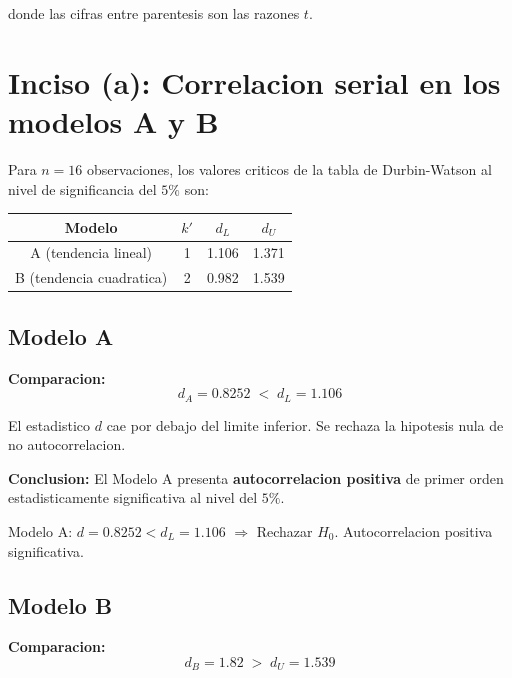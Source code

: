 \documentclass[12pt, letterpaper]{article}
\begin{document}
donde las cifras entre parentesis son las razones $t$.

\section{Inciso (a): Correlacion serial en los modelos A y B}

Para $n = 16$ observaciones, los valores criticos de la tabla de Durbin-Watson
al nivel de significancia del $5\%$ son:

\begin{center}
\renewcommand{\arraystretch}{1.3}
\small
\begin{tabular}{cccc}
\toprule
\textbf{Modelo} & $k'$ & $d_L$ & $d_U$ \\
\midrule
A (tendencia lineal)    & 1 & 1.106 & 1.371 \\
B (tendencia cuadratica)& 2 & 0.982 & 1.539 \\
\bottomrule
\end{tabular}
\end{center}

\subsection{Modelo A}

\textbf{Comparacion:}
\begin{equation}
  d_A = 0.8252 \;<\; d_L = 1.106
\end{equation}

El estadistico $d$ cae por debajo del limite inferior. Se rechaza la hipotesis
nula de no autocorrelacion.

\textbf{Conclusion:} El Modelo A presenta \textbf{autocorrelacion positiva}
de primer orden estadisticamente significativa al nivel del $5\%$.

\begin{clave}
  Modelo A: $d = 0.8252 < d_L = 1.106$ $\Rightarrow$
  Rechazar $H_0$. Autocorrelacion positiva significativa.
\end{clave}

\subsection{Modelo B}

\textbf{Comparacion:}
\begin{equation}
  d_B = 1.82 \;>\; d_U = 1.539
\end{equation}
\end{document}
